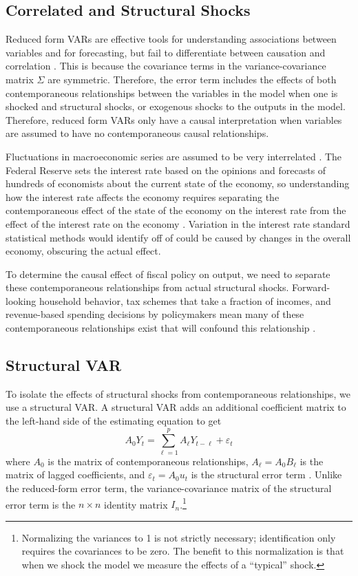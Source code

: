 \subsection{Correlated and Structural Shocks}

Reduced form VARs are effective tools for understanding associations between variables and for forecasting, but fail to differentiate between causation and correlation \parencite{stock2001vector}. This is because the covariance terms in the variance-covariance matrix $\Sigma$ are symmetric. Therefore, the error term includes the effects of both contemporaneous relationships between the variables in the model when one is shocked and structural shocks, or exogenous shocks to the outputs in the model. Therefore, reduced form VARs only have a causal interpretation when variables are assumed to have no contemporaneous causal relationships.

Fluctuations in macroeconomic series are assumed to be very interrelated \parencites{sims1980macroeconomics}{shapiro1988sources}{blanchard1988dynamic}{cochrane1994shocks}{nakamura2018identification}. The Federal Reserve sets the interest rate based on the opinions and forecasts of hundreds of economists about the current state of the economy, so understanding how the interest rate affects the economy requires separating the contemporaneous effect of the state of the economy on the interest rate from the effect of the interest rate on the economy \parencite{nakamura2018identification}. Variation in the interest rate standard statistical methods would identify off of could be caused by changes in the overall economy, obscuring the actual effect.

To determine the causal effect of fiscal policy on output, we need to separate these contemporaneous relationships from actual structural shocks. Forward-looking household behavior, tax schemes that take a fraction of incomes, and revenue-based spending decisions by policymakers mean many of these contemporaneous relationships exist that will confound this relationship \parencites{blanchard2002empirical}{gali2020effects}.


\subsection{Structural VAR} \label{subsec:svar}

To isolate the effects of structural shocks from contemporaneous relationships, we use a structural VAR. A structural VAR adds an additional coefficient matrix to the left-hand side of the estimating equation to get
\[
    A_0 Y_t = \sum_{\ell = 1}^p A_\ell Y_{t - \ell} + \varepsilon_t
\]
where $A_0$ is the matrix of contemporaneous relationships, $A_\ell = A_0 B_\ell$ is the matrix of lagged coefficients, and $\varepsilon_t = A_0 u_t$ is the structural error term \parencite{neusser2016time}. Unlike the reduced-form error term, the variance-covariance matrix of the structural error term is the $n \times n$ identity matrix $I_n$.\footnote{Normalizing the variances to 1 is not strictly necessary; identification only requires the covariances to be zero. The benefit to this normalization is that when we shock the model we measure the effects of a ``typical'' shock.}

